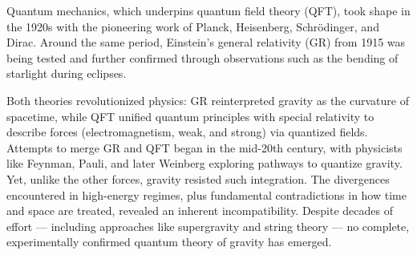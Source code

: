 

\begin{historical}
Quantum mechanics, which underpins quantum field theory (QFT), took shape in the 1920s with the pioneering work of Planck, Heisenberg, Schrödinger, and Dirac. Around the same period, Einstein’s general relativity (GR) from 1915 was being tested and further confirmed through observations such as the bending of starlight during eclipses. 

Both theories revolutionized physics: GR reinterpreted gravity as the curvature of spacetime, while QFT unified quantum principles with special relativity to describe forces (electromagnetism, weak, and strong) via quantized fields. Attempts to merge GR and QFT began in the mid-20th century, with physicists like Feynman, Pauli, and later Weinberg exploring pathways to quantize gravity. Yet, unlike the other forces, gravity resisted such integration. The divergences encountered in high-energy regimes, plus fundamental contradictions in how time and space are treated, revealed an inherent incompatibility. Despite decades of effort — including approaches like supergravity and string theory — no complete, experimentally confirmed quantum theory of gravity has emerged. 
\end{historical}
